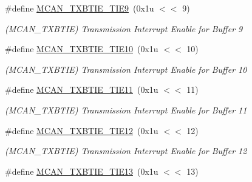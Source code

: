 \begin{DoxyCompactItemize}
\mbox{\label{group__SAME70__MCAN_gab85a78af8511ac5dc12f2e992627e47d}} 
\#define \mbox{\hyperlink{group__SAME70__MCAN_gab85a78af8511ac5dc12f2e992627e47d}{M\+C\+A\+N\+\_\+\+T\+X\+B\+T\+I\+E\+\_\+\+T\+I\+E9}}~(0x1u $<$$<$ 9)
\begin{DoxyCompactList}\small\item\em (M\+C\+A\+N\+\_\+\+T\+X\+B\+T\+IE) Transmission Interrupt Enable for Buffer 9 \end{DoxyCompactList}\item 
\mbox{\label{group__SAME70__MCAN_ga9ce3a0e91a85ffda95d5aff59da6c381}} 
\#define \mbox{\hyperlink{group__SAME70__MCAN_ga9ce3a0e91a85ffda95d5aff59da6c381}{M\+C\+A\+N\+\_\+\+T\+X\+B\+T\+I\+E\+\_\+\+T\+I\+E10}}~(0x1u $<$$<$ 10)
\begin{DoxyCompactList}\small\item\em (M\+C\+A\+N\+\_\+\+T\+X\+B\+T\+IE) Transmission Interrupt Enable for Buffer 10 \end{DoxyCompactList}\item 
\mbox{\label{group__SAME70__MCAN_ga614dcfad43703ab55ee13f45d5aa14e5}} 
\#define \mbox{\hyperlink{group__SAME70__MCAN_ga614dcfad43703ab55ee13f45d5aa14e5}{M\+C\+A\+N\+\_\+\+T\+X\+B\+T\+I\+E\+\_\+\+T\+I\+E11}}~(0x1u $<$$<$ 11)
\begin{DoxyCompactList}\small\item\em (M\+C\+A\+N\+\_\+\+T\+X\+B\+T\+IE) Transmission Interrupt Enable for Buffer 11 \end{DoxyCompactList}\item 
\mbox{\label{group__SAME70__MCAN_ga3d7593f4c76959b4f63714c85fcfe769}} 
\#define \mbox{\hyperlink{group__SAME70__MCAN_ga3d7593f4c76959b4f63714c85fcfe769}{M\+C\+A\+N\+\_\+\+T\+X\+B\+T\+I\+E\+\_\+\+T\+I\+E12}}~(0x1u $<$$<$ 12)
\begin{DoxyCompactList}\small\item\em (M\+C\+A\+N\+\_\+\+T\+X\+B\+T\+IE) Transmission Interrupt Enable for Buffer 12 \end{DoxyCompactList}\item 
\mbox{\label{group__SAME70__MCAN_ga723ad8c879c1051a85b93432dd2be01e}} 
\#define \mbox{\hyperlink{group__SAME70__MCAN_ga723ad8c879c1051a85b93432dd2be01e}{M\+C\+A\+N\+\_\+\+T\+X\+B\+T\+I\+E\+\_\+\+T\+I\+E13}}~(0x1u $<$$<$ 13)
$$
\end{DoxyCompactItemize}
